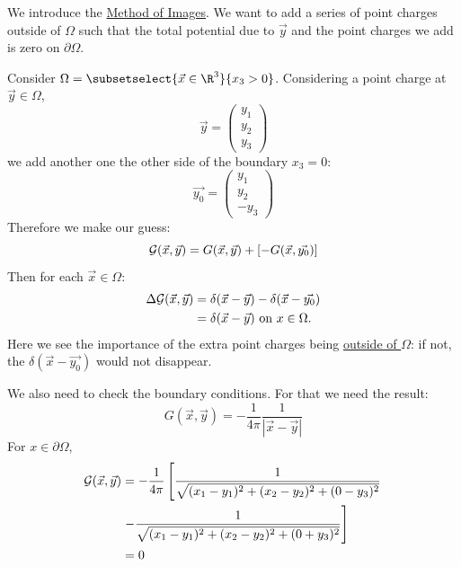 \documentclass[../Main.tex]{subfiles}
\begin{document}
We introduce the \underline{Method of Images}. We want to add a series of point charges outside of $\Omega$ such that the total potential due to $\vec{y}$ and the point charges we add is zero on $\partial \Omega$.
\begin{example}
    Consider $\Omega = \subsetselect{\vec{x} \in \R^3}{x_3 > 0}$.
    Considering a point charge at $\vec{y} \in \Omega$,
    \begin{equation*}
        \vec{y} = \begin{pmatrix}y_1 \\ y_2 \\ y_3\end{pmatrix}
    \end{equation*}
    we add another one the other side of the boundary $x_3 = 0$:
    \begin{equation*}
        \vec{y_0} = \begin{pmatrix}y_1 \\ y_2 \\ -y_3\end{pmatrix}
    \end{equation*}
    Therefore we make our guess:
    \begin{equation*}
        \mathcal{G}(\vec{x}, \vec{y}) = G(\vec{x}, \vec{y}) + \left[-G(\vec{x}, \vec{y_0})\right]
    \end{equation*}
    Then for each $\vec{x} \in \Omega$:
    \begin{align*}
        \Delta \mathcal{G}(\vec{x}, \vec{y}) &= \delta(\vec{x} - \vec{y}) - \delta(\vec{x} - \vec{y_0}) \\
        &= \delta(\vec{x} - \vec{y}) \text{ on $x \in \Omega$.}
    \end{align*}
    Here we see the importance of the extra point charges being \underline{outside of $\Omega$}: if not, the $\delta(\vec{x} - \vec{y_0})$ would not disappear.

    We also need to check the boundary conditions. For that we need the result:
    \begin{equation*}
        G(\vec{x}, \vec{y}) = -\frac{1}{4\pi} \frac{1}{|\vec{x} - \vec{y}|}
    \end{equation*}
    For $x \in \partial \Omega$,
    \begin{align*}
        \mathcal{G}(\vec{x}, \vec{y}) &= -\frac{1}{4\pi} \left[\frac{1}{\sqrt{(x_1 - y_1)^2 + (x_2 - y_2)^2 + (0 - y_3)^2}} \right. \\
        &\left. - \frac{1}{\sqrt{(x_1 - y_1)^2 + (x_2 - y_2)^2 + (0 + y_3)^2}}\right] \\
        &= 0
    \end{align*}
\end{example}
\end{document}
